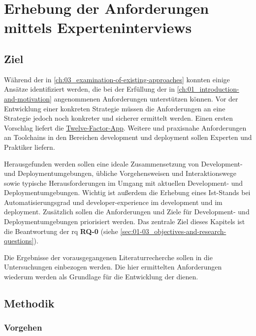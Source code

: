 \section{Erhebung der Anforderungen mittels Experteninterviews}
\label{sec:04-01_collection-of-requirements-using-expert-interviews}

\subsection{Ziel}
\label{subsec:04-01-01_goal}

Während der  in \autoref{ch:03_examination-of-existing-approaches} konnten einige Ansätze identifiziert werden, die bei der Erfüllung der in \autoref{ch:01_introduction-and-motivation} angenommenen Anforderungen unterstützen können. Vor der Entwicklung einer konkreten Strategie müssen die Anforderungen an eine  Strategie jedoch noch konkreter und sicherer ermittelt werden. Einen ersten Vorschlag liefert die \hyperref[sec:03-05_basic-idea-of-twelve-factor-app]{Twelve-Factor-App}. Weitere und praxisnahe Anforderungen an Toolchains in den Bereichen \Gls{development} und \Gls{deployment} sollen Experten und Praktiker liefern.

Herausgefunden werden sollen eine ideale Zusammensetzung von Development- und Deploymentumgebungen, übliche Vorgehensweisen und Interaktionswege sowie typische Herausforderungen im Umgang mit aktuellen Development- und Deploymentumgebungen. Wichtig ist außerdem die Erhebung eines Ist-Stands bei Automatisierungsgrad und \Gls{developer-experience} im \Gls{development} und im \Gls{deployment}. Zusätzlich sollen die Anforderungen und Ziele für Development- und Deploymentumgebungen priorisiert werden. Das zentrale Ziel dieses Kapitels ist die Beantwortung der \acrlong{rq} \textbf{RQ-0} (siehe \autoref{sec:01-03_objectives-and-research-questions}).

Die Ergebnisse der vorausgegangenen Literaturrecherche sollen in die Untersuchungen einbezogen werden. Die hier ermittelten Anforderungen wiederum werden als Grundlage für die Entwicklung der  dienen.

\subsection{Methodik}
\label{subsec:04-01-02_methodology}

\subsubsection{Vorgehen}
\label{subsubsec:04-01-02-01_procedure}

